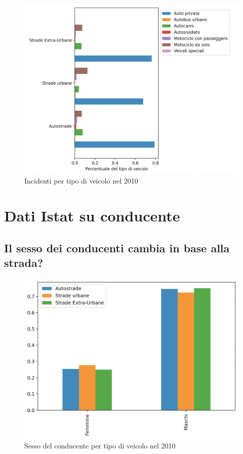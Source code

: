 \documentclass[a4paper]{report}
\begin{document}
\begin{figure}
    \includegraphics[width=\linewidth]{../src/incidenti/incidenti_senza_coords/tipo_veicoli/differenza_strade.png}
    \caption{Incidenti per tipo di veicolo nel 2010}
    \label{fig:differenza-strade}
\end{figure}

\section{Dati Istat su conducente}

\subsection{Il sesso dei conducenti cambia in base alla strada?}

\begin{figure}
    \includegraphics[width=\linewidth]{../src/incidenti/incidenti_senza_coords/tipo_veicoli/uomo-donna.png}
    \caption{Sesso del conducente per tipo di veicolo nel 2010}
    \label{fig:differenza-uomo-donna}
\end{figure}
\end{document}

